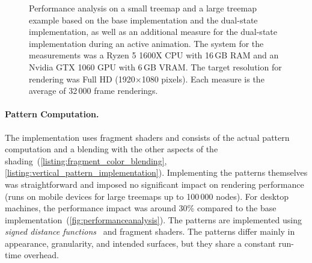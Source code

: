 \documentclass[smallextended,natbib]{svjour3}       %
\begin{document}
\begin{figure}[tb]
%
    \vspace{-0.5\baselineskip}
    \caption{
        Performance analysis on a small treemap and a large treemap example based on the base implementation and the dual-state implementation, as well as an additional measure for the dual-state implementation during an active animation. The system for the measurements was a Ryzen 5 1600X CPU with 16\,GB RAM and an Nvidia GTX 1060 GPU with 6\,GB VRAM. The target resolution for rendering was Full HD (1920$\times$1080 pixels). Each measure is the average of 32\,000 frame renderings.
    }
    \label{fig:performanceanalysis}
\end{figure}

\paragraph{Pattern Computation.}
The implementation uses fragment shaders and consists of the actual pattern computation and a blending with the other aspects of the shading~(\autoref{listing:fragment_color_blending}, \autoref{listing:vertical_pattern_implementation}). 
Implementing the patterns themselves was straightforward and imposed no significant impact on rendering performance (runs on mobile devices for large treemaps up to 100\,000 nodes).
For desktop machines, the performance impact was around 30\% compared to the base implementation~(\autoref{fig:performanceanalysis}).
The patterns are implemented using \emph{signed distance functions}~\citep{Vivo} and fragment shaders.
The patterns differ mainly in appearance, granularity, and intended surfaces, but they share a constant run-time overhead.
\end{document}
